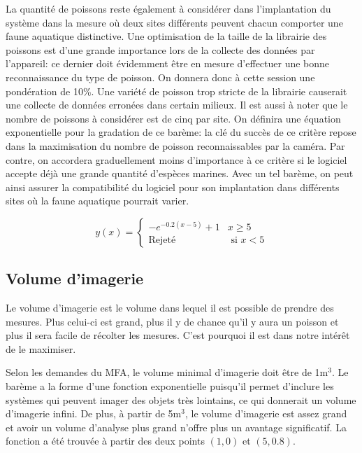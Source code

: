 La quantité de poissons reste également à considérer dans l'implantation du système dans la mesure où deux sites différents peuvent chacun comporter une faune aquatique distinctive. Une optimisation de la taille de la librairie des poissons est d'une grande importance lors de la collecte des données par l'appareil: ce dernier doit évidemment être en mesure d'effectuer une bonne reconnaissance du type de poisson. On donnera donc à cette session une pondération de 10\%. Une variété de poisson trop stricte de la librairie causerait une collecte de données erronées dans certain milieux. Il est aussi à noter que le nombre de poissons à considérer est de cinq par site. On définira une équation exponentielle pour la gradation de ce barème: la clé du succès de ce critère repose dans la maximisation du nombre de poisson reconnaissables par la caméra. Par contre, on accordera graduellement moins d'importance à ce critère si le logiciel accepte déjà une grande quantité d'espèces marines. Avec un tel barème, on peut ainsi assurer la compatibilité du logiciel pour son implantation dans différents sites où la faune aquatique pourrait varier.

\begin{equation}
    y(x) = \begin{cases}
        -e^{-0.2(x-5)} + 1 & x \geq 5 \\
        \text{Rejeté} & \text{ si } x < 5 
    \end{cases}
    \label{eq:bareme_identification}
\end{equation}

\subsection{Volume d'imagerie}
\label{Vdi}

Le volume d'imagerie est le volume dans lequel il est possible de prendre des mesures. Plus celui-ci est grand, plus il y de chance qu'il y aura un poisson et plus il sera facile de récolter les mesures. C'est pourquoi il est dans notre intérêt de le maximiser.

Selon les demandes du MFA, le volume minimal d'imagerie doit être de 1m$^3$. Le barème a la forme d'une fonction exponentielle puisqu'il permet d'inclure les systèmes  qui peuvent imager des objets très lointains, ce qui donnerait un volume d'imagerie infini. De plus, à partir de 5m$^3$, le volume d'imagerie est assez grand et avoir un volume d'analyse plus grand n'offre plus un avantage significatif. La fonction a été trouvée à partir des deux points $(1, 0)$ et $(5, 0.8)$.

